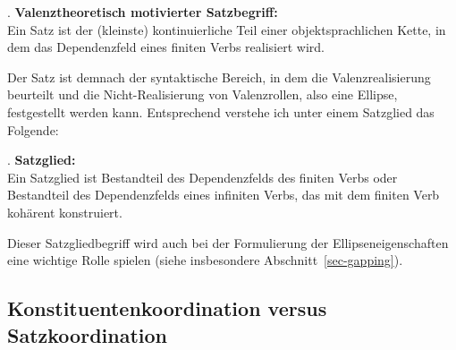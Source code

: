 \ex. \label{ex-satzbegriff} {\bf Valenztheoretisch motivierter Satzbegriff:} \\
Ein Satz ist der (kleinste) kontinuierliche Teil einer objektsprachlichen Kette, in dem das Dependenzfeld eines finiten Verbs realisiert wird.

Der Satz ist demnach der syntaktische Bereich, in dem die Valenzrealisierung beurteilt und die Nicht-Realisierung von Valenzrollen, also eine Ellipse, festgestellt werden kann. Entsprechend verstehe ich unter einem Satzglied das Folgende:

\ex. \label{ex-satzglied} {\bf Satzglied:}\\
Ein Satzglied ist Bestandteil des Dependenzfelds des finiten Verbs oder Bestandteil des Dependenzfelds eines infiniten Verbs, das mit dem finiten Verb kohärent konstruiert.

Dieser Satzgliedbegriff wird auch bei der Formulierung der Ellipseneigenschaften eine wichtige Rolle spielen (siehe insbesondere Abschnitt~\ref{sec-gapping}).


\subsection{Konstituentenkoordination versus Satzkoordination} \label{sec-ellipse-kappa}

